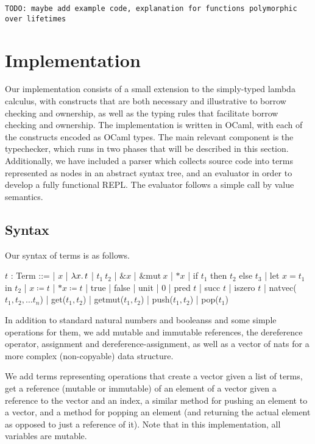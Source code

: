 \documentclass[letterpaper,11pt]{article}
\begin{document}
\texttt{TODO: maybe add example code, explanation for functions polymorphic over lifetimes}

\section{Implementation}
Our implementation consists of a small extension to the simply-typed lambda calculus,
with constructs that are both necessary and illustrative to borrow checking and ownership,
as well as the typing rules that facilitate borrow checking and ownership. The
implementation is written in OCaml, with each of the constructs encoded as
OCaml types. The main relevant component is the typechecker, which runs in two
phases that will be described in this section. Additionally, we have included a
parser which collects source code into terms represented as nodes in an abstract syntax tree, 
and an evaluator in order to develop a fully functional REPL. The evaluator follows a simple
call by value semantics.

\subsection{Syntax}
Our syntax of terms is as follows.
\begin{center}
    \begin{bnf}
        $t$ : \textsf{Term} ::=
        | $x$ | $\lambda x\ldotp t$ | $t_1\ t_2$ | $\&x$ | $\&\text{mut}\ x$ | $*x$
        | if $t_1$ then $t_2$ else $t_3$
        | let $x = t_1$ in $t_2$
        | $x \coloneq t$
        | $*x \coloneq t$
        | true
        | false
        | unit
        | 0
        | pred $t$
        | succ $t$
        | iszero $t$
        | natvec($t_1,t_2,\dots t_n$)
        | get($t_1,t_2$)
        | getmut($t_1,t_2$)
        | push($t_1,t_2$)
        | pop($t_1$) 
    \end{bnf}
\end{center}
In addition to standard natural numbers and booleanss and some simple operations for them, we add
mutable and immutable references, the dereference operator, assignment and
dereference-assignment, as well as a vector of nats for a more complex
(non-copyable) data structure. 

We add terms representing operations that create a vector given a list of terms, 
get a reference (mutable or immutable) of an element of a vector given a reference to the vector and an index, 
a similar method for pushing an element to a vector, and a method for popping an element
(and returning the actual element as opposed to just a reference of it). Note that
in this implementation, all variables are mutable.
\end{document}
